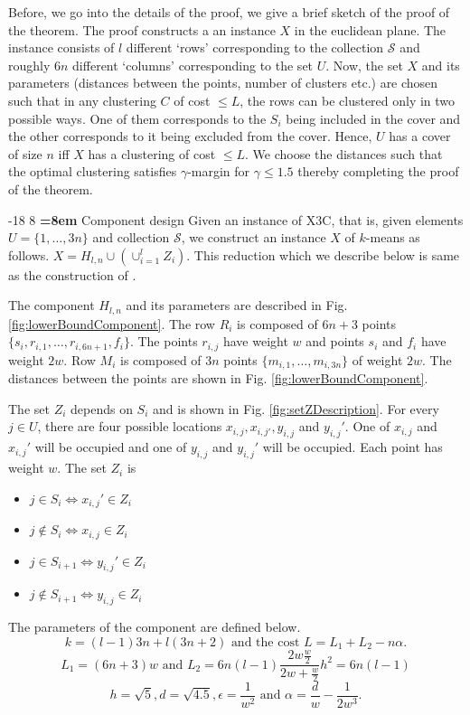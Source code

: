 \documentclass[orivec]{llncs}
\makeatletter
\newcommand{\mc}{\mathcal}
\renewcommand\subsubsection{\@startsection{subsubsection}{3}{\z@}%
   {-18\p@ \@plus -4\p@ \@minus -4\p@}%
   {8\p@ \@plus 4\p@ \@minus 4\p@}%
   {\normalfont\normalsize\bfseries\boldmath
   \rightskip=\z@ \@plus 8em \pretolerance=10000}}
\makeatother
\begin{document}
Before, we go into the details of the proof, we give a brief sketch of the proof of the theorem. The proof constructs a an instance $X$ in the euclidean plane. The instance consists of $l$ different `rows' corresponding to the collection $\mc S$ and roughly $6n$ different `columns' corresponding to the set $U$. Now, the set $X$ and its parameters (distances between the points, number of clusters etc.) are chosen such that in any clustering $C$ of cost $\le L$, the rows can be clustered only in two possible ways. One of them corresponds to the $S_i$ being included in the cover and the other corresponds to it being excluded from the cover. Hence, $U$ has a cover of size $n$ iff $X$ has a clustering of cost $\le L$. We choose the distances such that the optimal clustering satisfies $\gamma$-margin for $\gamma \le 1.5$ thereby completing the proof of the theorem. 
  
\subsubsection{Component design}
Given an instance of X3C, that is, given elements $U = \{1, \ldots, 3n\}$ and collection $\mc S$, we construct an instance $X$ of $k$-means as follows. $X = H_{l,n} \cup (\cup_{i=1}^l Z_i)$. This reduction which we describe below is same as the construction of \cite{vattani2009hardness}.

The component $H_{l,n}$ and its parameters are described in Fig. \ref{fig:lowerBoundComponent}. The row $R_i$ is composed of $6n + 3$ points $\{s_i, r_{i, 1}, \ldots, r_{i, 6n+1}, f_i\}$. The points $r_{i, j}$ have weight $w$ and points $s_i$ and $f_i$ have weight $2w$. Row $M_i$ is composed of $3n$ points $\{m_{i,1}, \ldots, m_{i, 3n}\}$ of weight $2w$. The distances between the points are shown in Fig. \ref{fig:lowerBoundComponent}.

The set $Z_i$ depends on $S_i$ and is shown in Fig. \ref{fig:setZDescription}.  For every $j\in U$, there are four possible locations $x_{i, j}, x_{i,j'}, y_{i,j}$ and $y_{i, j}'$. One of $x_{i,j}$ and $x_{i,j}'$ will be occupied and one of $y_{i,j}$ and $y_{i,j}'$ will be occupied. Each point has weight $w$. The set $Z_i$ is
\begin{itemize}[nolistsep,noitemsep]
\item $j \in S_i \iff x_{i,j}' \in Z_i$
\item $j \not\in S_i \iff x_{i,j} \in Z_i$
\item $j \in S_{i+1} \iff y_{i,j}' \in Z_i$
\item $j \not\in S_{i+1} \iff y_{i,j} \in Z_i$

\end{itemize}
The parameters of the component are defined below. $$k = (l-1)3n + l(3n+2) \text{ and the cost }L = L_1 + L_2 -n\alpha.$$
$$L_1 = (6n+3)w \text{ and } L_2 = 6n(l-1)\frac{2w\frac{w}{2}}{2w+\frac{w}{2}}h^2 = 6n(l-1)$$
$$h = \sqrt{5}, d = \sqrt{4.5}, \epsilon = \frac{1}{w^2} \text{ and } \alpha = \frac{d}{w}-\frac{1}{2w^3}.$$
\end{document}
